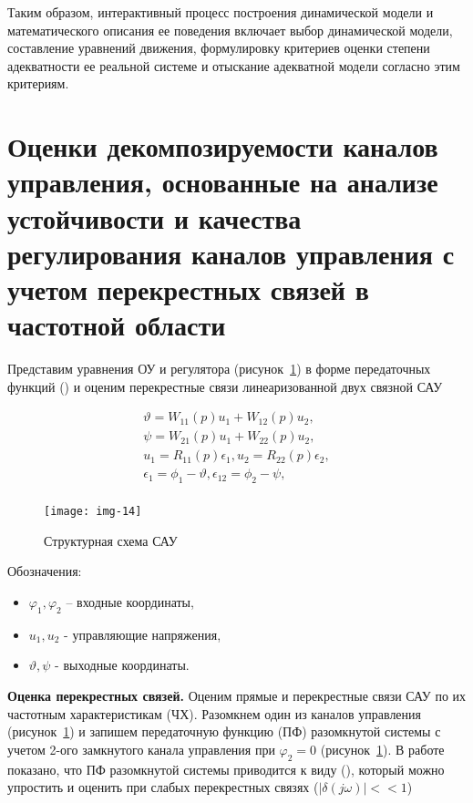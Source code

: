 Таким образом, интерактивный процесс построения динамической модели и математического описания ее поведения включает выбор динамической модели, составление уравнений движения, формулировку критериев оценки степени адекватности ее реальной системе и отыскание адекватной модели согласно этим критериям.


\section{Оценки декомпозируемости каналов управления, основанные на анализе устойчивости и качества регулирования каналов управления с учетом перекрестных связей в частотной области} \label{sec:ch2/sec5}

Представим уравнения ОУ и регулятора (рисунок~\ref{fig:img-14}) в форме передаточных функций () и оценим перекрестные связи линеаризованной двух связной САУ 

\begin{equation}
\label{eq:p2:11-}
\begin{alignedat}{4}
\vartheta{}=W_{11}(p)u_1+W_{12}\left(p\right)u_2 ,\\
\psi{}=W_{21}(p)u_1+W_{22}\left(p\right)u_2 ,\\
u_1=R_{11}(p){\epsilon{}}_1,u_2=R_{22}(p){\epsilon{}}_2 ,\\
{\epsilon{}}_1={\phi{}}_1-\vartheta{},{\epsilon{}}_{12}={\phi{}}_2-\psi{} ,\\
\end{alignedat}
\end{equation}

\begin{figure}[ht]
	\centering
	\texttt{[image: img-14]} 
	\caption{Структурная схема САУ}
	\label{fig:img-14}
\end{figure}

Обозначения: 
\begin{itemize}
	\item $\varphi_1, \varphi_2$ – входные координаты,
	\item $u_1, u_2$ - управляющие напряжения,
	\item $\vartheta,\psi$ - выходные координаты.
\end{itemize}
 
\textbf{Оценка перекрестных связей.} \label{sec:ch2/sec5/s1}
Оценим прямые и перекрестные связи САУ по их частотным характеристикам (ЧХ). 
Разомкнем один из каналов управления (рисунок~\ref{fig:img-14}) и запишем передаточную функцию (ПФ) разомкнутой системы с учетом 2-ого замкнутого канала управления при $\varphi_2=0$ (рисунок~\ref{fig:img-14}). 
В работе \cite[]{Karpov} показано, что ПФ разомкнутой системы приводится к виду (), который можно упростить и оценить при слабых перекрестных связях ($\left| \delta(j\omega) \right| <<1$) 

